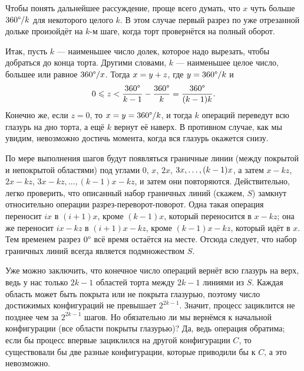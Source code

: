 Чтобы понять дальнейшее рассуждение, проще всего думать, что $x$ чуть больше $360\degree/k$ для некоторого целого $k$.
В этом случае первый разрез по уже отрезанной дольке произойдёт на $k$-м шаге, когда торт провернётся на полный оборот.

Итак, пусть $k$ --- наименьшее число долек, которое надо вырезать, чтобы добраться до конца торта.
Другими словами, $k$ --- наименьшее целое число, большее или равное $360\degree/x$.
Тогда $x \z= y + z$, где $y \z= 360\degree/k$ и 
\[0\leqslant z <\frac{360\degree}{k-1}-\frac{360\degree}{k}=\frac{360\degree}{(k-1)k}.\]
Конечно же, если $z = 0$, то $x = y = 360\degree/k$, и тогда $k$ операций переведут всю глазурь на дно торта, а ещё $k$ вернут её наверх.
В противном случае, как мы увидим, невозможно достичь момента, когда вся глазурь окажется снизу.

По мере выполнения шагов будут появляться граничные линии (между покрытой и непокрытой областями) под углами $0$, $x$, $2x$, $3x, \z\dots , (k - 1)x$, а затем $x - kz$, $2x - kz$, $3x - kz, \dots , (k - 1)x - kz$,
и затем они повторяются.
Действительно, легко проверить, что описанный набор граничных линий (скажем, $S$) замкнут относительно операции разрез-переворот-поворот.
Одна такая операция переносит $ix$ в $(i + 1)x$, кроме $(k - 1)x$, который переносится в $x - kz$;
она же переносит $ix - kz$ в $(i + 1)x - kz$, кроме $(k - 1)x - kz$, который идёт в $x$.
Тем временем разрез $0\degree$ всё время остаётся на месте.
Отсюда следует, что набор граничных линий всегда является подмножеством $S$.

Уже можно заключить, что конечное число операций вернёт всю глазурь на верх, ведь у нас только $2k - 1$ областей торта между $2k - 1$ линиями из $S$.
Каждая область может быть покрыта или не покрыта глазурью, поэтому число достижимых конфигураций не превышает $2^{2k-1}$.
Значит, процесс зациклится не позднее чем за $2^{2k-1}$ шагов.
Но обязательно ли мы вернёмся к начальной конфигурации (все области покрыты глазурью)?
Да, ведь операция обратима;
если бы процесс впервые зациклился на другой конфигурации $C$, то существовали бы две разные конфигурации, которые приводили бы к $C$, а это невозможно.

